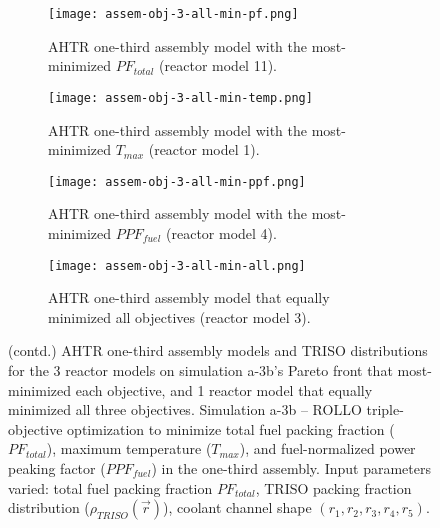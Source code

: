 \begin{figure}[htbp!]
    \ContinuedFloat
    \begin{subfigure}{0.49\textwidth}
        \centering
        \texttt{[image: assem-obj-3-all-min-pf.png]}
        \caption{\gls{AHTR} one-third assembly model with the most-minimized $PF_{total}$ 
        (reactor model 11).}
        \label{fig:assem-obj-3-all-min-pf} 
    \end{subfigure}
    \begin{subfigure}{0.49\textwidth}
        \centering
        \texttt{[image: assem-obj-3-all-min-temp.png]}
        \caption{\gls{AHTR} one-third assembly model with the most-minimized $T_{max}$
        (reactor model 1).}
        \label{fig:assem-obj-3-all-min-temp} 
    \end{subfigure}
    \begin{subfigure}{0.49\textwidth}
        \centering
        \texttt{[image: assem-obj-3-all-min-ppf.png]}
        \caption{\gls{AHTR} one-third assembly model with the most-minimized $PPF_{fuel}$
        (reactor model 4).}
        \label{fig:assem-obj-3-all-min-ppf} 
    \end{subfigure}
    \begin{subfigure}{0.49\textwidth}
        \centering
        \texttt{[image: assem-obj-3-all-min-all.png]}
        \caption{\gls{AHTR} one-third assembly model that equally minimized all 
        objectives (reactor model 3).}
        \label{fig:assem-obj-3-all-min-all} 
    \end{subfigure}
    \begin{subfigure}{.3\textwidth}
    \vspace{1cm}
    \centering
\end{subfigure}
    \caption{(contd.) AHTR one-third assembly models and TRISO distributions for the 3 
    reactor models on simulation a-3b's Pareto front that most-minimized each 
    objective, and 1 reactor model that equally minimized all three objectives.
    Simulation a-3b -- ROLLO triple-objective optimization to minimize 
    total fuel packing fraction ($PF_{total}$), maximum temperature ($T_{max}$), 
    and fuel-normalized power peaking factor ($PPF_{fuel}$) in the one-third assembly. 
    Input parameters varied: total fuel packing fraction $PF_{total}$, 
    TRISO packing fraction distribution ($\rho_{TRISO}(\vec{r})$), 
    coolant channel shape $(r_1, r_2, r_3, r_4, r_5)$.}
\end{figure}

